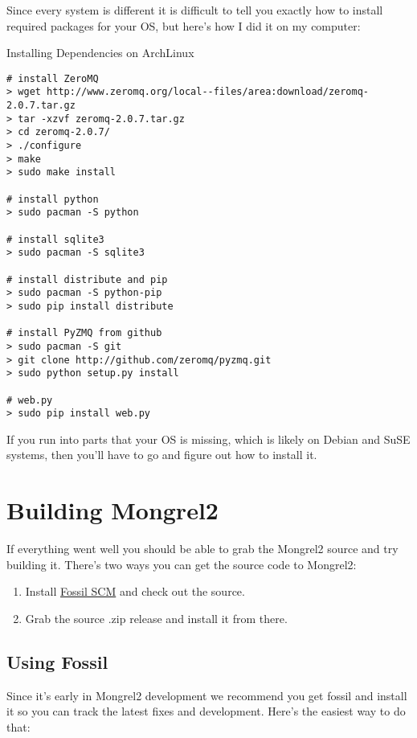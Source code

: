 Since every system is different it is difficult to tell you exactly how to
install required packages for your OS, but here's how I did it on my computer:


\begin{code}{Installing Dependencies on ArchLinux}
\begin{Verbatim}
# install ZeroMQ
> wget http://www.zeromq.org/local--files/area:download/zeromq-2.0.7.tar.gz
> tar -xzvf zeromq-2.0.7.tar.gz
> cd zeromq-2.0.7/
> ./configure
> make
> sudo make install

# install python
> sudo pacman -S python

# install sqlite3
> sudo pacman -S sqlite3

# install distribute and pip
> sudo pacman -S python-pip
> sudo pip install distribute

# install PyZMQ from github
> sudo pacman -S git
> git clone http://github.com/zeromq/pyzmq.git
> sudo python setup.py install

# web.py
> sudo pip install web.py
\end{Verbatim}
\end{code}

If you run into parts that your OS is missing, which is likely on
Debian and SuSE systems, then you'll have to go and figure out 
how to install it.


\section{Building Mongrel2}

If everything went well you should be able to grab the Mongrel2 source
and try building it.  There's two ways you can get the source code to
Mongrel2:

\begin{enumerate}
\item Install \href{http://fossil-scm.org}{Fossil SCM} and check out the source.
\item Grab the source .zip release and install it from there.
\end{enumerate}

\subsection{Using Fossil}

Since it's early in Mongrel2 development we recommend you get fossil and install it
so you can track the latest fixes and development.  Here's the easiest way to
do that:

